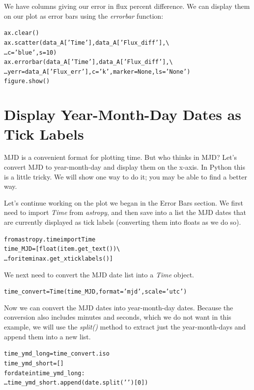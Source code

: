 We have columns giving our error in flux percent difference. We can display them on our plot as
error bars using the \textit{errorbar} function:

\begin{alltt}
\pytab ax.clear()
\pytab ax.scatter(data_A['Time'], data_A['Flux_diff'], \textbackslash
\ldots c='blue', s=10)
\pytab ax.errorbar(data_A['Time'], data_A['Flux_diff'], \textbackslash 
\ldots yerr=data_A['Flux_err'], c='k', marker=None, ls='None')
\pytab figure.show()
\end{alltt}


\section{Display Year-Month-Day Dates as Tick Labels}

MJD is a convenient format for plotting time. But who 
thinks in MJD? Let's convert MJD to year-month-day and display them 
on the x-axis. In Python this is a little tricky. We will show one way to do
it; you may be able to find a better way.

Let's continue working on the plot we began in the Error Bars section.
We first need to import \textit{Time} from \textit{astropy}, and then save
into a list the MJD dates that are currently displayed as tick labels (converting them into
floats as we do so).

\begin{alltt}
\pytab from astropy.time import Time
\pytab time\_MJD = [float(item.get\_text()) \textbackslash
\ldots for item in ax.get\_xticklabels()]
\end{alltt}

We next need to convert the MJD date list into a \textit{Time} object. 

\begin{alltt}
\pytab time\_convert = Time(time\_MJD, format='mjd', scale='utc')
\end{alltt}

Now we can convert the MJD dates into year-month-day dates. Because
the conversion also includes minutes and seconds, which we do not want
in this example, we will use the \textit{split()} method to extract just the 
year-month-days and append them into a new list. 

\begin{alltt}
\pytab time\_ymd\_long = time\_convert.iso
\pytab time\_ymd\_short = []
\pytab for date in time\_ymd\_long:
\ldots    time\_ymd\_short.append(date.split(' ')[0])
\end{alltt}

